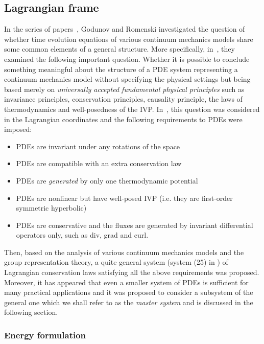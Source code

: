\documentclass[twoside]{article}
\begin{document}
\subsection{Lagrangian frame}\label{sec.lagr}

In the series of 
papers~\cite{GodRom1995,GodRom1996,GodRom1996a,GodRom1998,GodRom1998,Rom2001,Romenski2002,GodRom2003}, Godunov and Romenski investigated the question of 
whether time evolution equations of various continuum mechanics models share 
some common elements of a general structure. More specifically, 
in~\cite{GodRom1996a}, they examined the following important  question.
Whether it is possible to conclude something meaningful about the 
structure of a PDE system representing a continuum mechanics model without 
specifying the physical settings but being based merely on \textit{universally 
accepted 
fundamental physical principles} such as invariance principles, conservation 
principles, causality principle, the laws of thermodynamics and well-posedness 
of the IVP. In~\cite{GodRom1996a}, this question was considered in the 
Lagrangian coordinates and the following requirements to PDEs were imposed:
\begin{itemize}
\item PDEs are invariant under any rotations of the space
\item PDEs are compatible with an extra conservation law
\item PDEs are \textit{generated} by only one thermodynamic potential
\item PDEs are nonlinear but have well-posed IVP (i.e. they are first-order 
symmetric hyperbolic)
\item PDEs are conservative and the fluxes are generated by invariant
  differential operators only, such as div, grad and curl.
\end{itemize}
Then, based on the analysis of various continuum mechanics models and 
the group representation theory, a quite 
general system (system (25) in \cite{GodRom1996a}) of Lagrangian conservation 
laws satisfying all the above 
requirements was proposed. Moreover, it has 
appeared that even a smaller system of PDEs is sufficient for many practical 
applications and it was proposed to consider a subsystem of the general one 
which we shall refer to as the \textit{master system} and is discussed in the 
following section. 


\subsubsection{Energy formulation}
\end{document}
